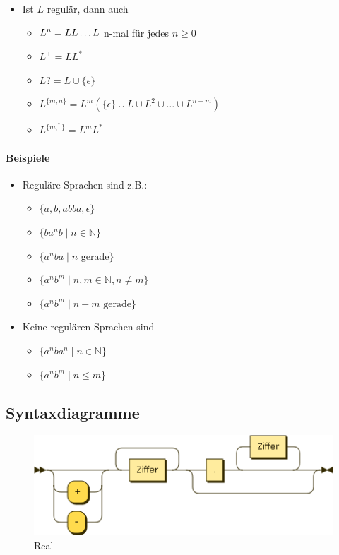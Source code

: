 \documentclass{scrartcl}
\begin{document}
\begin{itemize}
\begin{itemize}
		\item Ist $L$ regulär, dann auch
		\begin{itemize}
			\item $L^n = LL \ldots L \hfill$ n-mal für jedes $n \geq 0$
			\item $L^+ = LL^*$
			\item $L? = L \cup \{ \epsilon \}$
			\item $L^{\{  m,n \}} = L^m(\{ \epsilon \} \cup L \cup L^2 \cup \ldots \cup L^{n-m})$
			\item $L^{\{ m,^* \}} = L^mL^*$
		\end{itemize}
	\end{itemize}
\end{itemize}

\paragraph{Beispiele}

\begin{itemize}
	\item Reguläre Sprachen sind z.B.:
	\begin{itemize}
		\item $\{ a,b,abba, \epsilon \}$
		\item $\{ ba^nb \mid n \in \mathbb{N} \}$
		\item $\{ a^nba \mid n \text{ gerade} \}$
		\item $\{ a^nb^m \mid n,m \in \mathbb{N}, n \neq m \}$
		\item $\{ a^nb^m \mid n+m \text{ gerade} \}$
	\end{itemize}
	\item Keine regulären Sprachen sind
	\begin{itemize}
		\item $\{ a^nba^n \mid n \in \mathbb{N} \}$
		\item $\{ a^nb^m \mid n \leq m \}$
	\end{itemize}
\end{itemize}

\subsection{Syntaxdiagramme}

\begin{figure}[ht]
	\centering
	\includegraphics[scale=.5]{figures/Real.png}
	\caption{Real}
	\label{real}
\end{figure}
\end{document}
